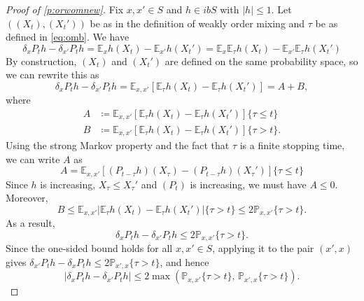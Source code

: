 \documentclass[12pt,reqno]{amsart}
\numberwithin{equation}{section}
\theoremstyle{definition}
\newcommand{\1}{\mathbbm{1}}
\newcommand{\PP}{\mathbb P}
\newcommand{\EE}{\mathbb E}
\begin{document}
\begin{proof}[Proof of \cref{p:orwomnew}]
    Fix $x, x' \in S$ and $h \in ibS$ with $|h| \leq 1$.  Let $((X_t),
    (X_t'))$ be as in the definition of weakly order mixing and $\tau$ be as
    defined in \eqref{eq:omb}. We have
    \begin{equation*}
        \delta_x P_t h - \delta_{x'} P_t h
        = \EE_x  h(X_t) - \EE_{x'} h(X_t')
        = \EE_x \EE_\tau h(X_t) - \EE_{x'} \EE_\tau h(X_t')
    \end{equation*}
    By construction, $(X_t)$ and $(X_t')$ are defined on the same probability
    space, so we can rewrite this as
    \begin{equation*}
        \delta_x P_t h - \delta_{x'} P_t h
        = \EE_{x,x'} [\EE_\tau h(X_t) - \EE_\tau h(X_t')]
        = A + B,
    \end{equation*}
    where
    \begin{align*}
        A & \coloneq \EE_{x,x'} [\EE_\tau h(X_t) - \EE_\tau h(X_t')] \{\tau \leq t\}
        \\
        B & \coloneq \EE_{x,x'} [\EE_\tau h(X_t) - \EE_\tau h(X_t')] \{\tau > t\}.
    \end{align*}
    Using the strong Markov property and the fact that $\tau$ is a finite
    stopping time, we can write $A$ as
    \begin{equation*}
        A = \EE_{x,x'} [(P_{t-\tau}h)(X_\tau) - (P_{t-\tau} h)(X_\tau')] \{\tau \leq t\}
    \end{equation*}
    Since $h$ is increasing, $X_\tau \leq X_\tau'$ and $(P_t)$ is increasing, we
    must have $A \leq 0$.  Moreover,
    \begin{equation*}
        B \leq \EE_{x,x'} |\EE_\tau h(X_t) - \EE_\tau h(X_t')| \{\tau > t\}
        \leq 2 \PP_{x,x'} \{\tau > t\}.
    \end{equation*}
    As a result,
    \begin{equation*}
        \delta_x P_t h - \delta_{x'} P_t h \leq 2 \PP_{x,x'} \{\tau > t\}.
    \end{equation*}
    Since the one-sided bound holds for all $x, x' \in S$, applying it
    to the pair $(x', x)$ gives $\delta_{x'} P_t h - \delta_x P_t h
    \leq 2 \PP_{x',x} \{\tau > t\}$, and hence
    \begin{equation*}
        |\delta_x P_t h - \delta_{x'} P_t h| \leq 2 \max(\PP_{x,x'} \{\tau > t\},\, \PP_{x',x} \{\tau > t\}).
    \end{equation*}

\end{proof}
\end{document}
